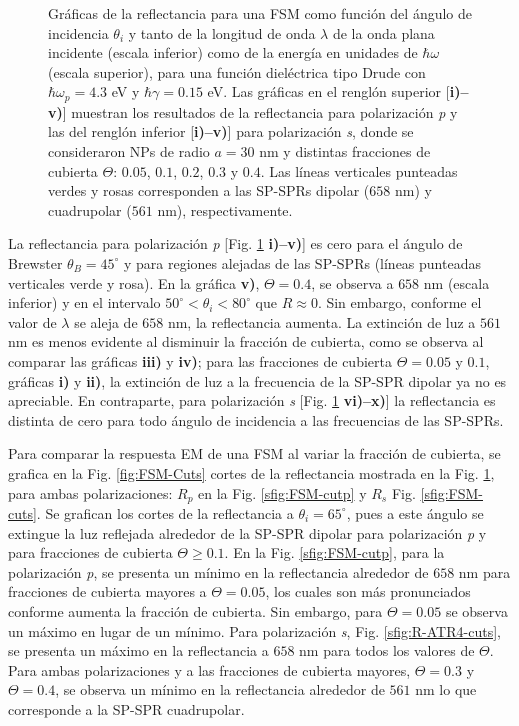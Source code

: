 \begin{figure}[h!]
\begin{tikzpicture}[scale=1]
\end{tikzpicture}\vspace*{-.75em}
	\caption{Gráficas de la reflectancia para una FSM como función del ángulo de incidencia $\theta_i$ y tanto de la longitud de onda $\lambda$ de la onda plana incidente (escala inferior) como de la energía en  unidades de $\hbar\omega$ (escala superior), para una función dieléctrica tipo Drude con $\hbar\omega_p=4. 3$ eV  y  $\hbar\gamma=0. 15$ eV.  Las gráficas   en el renglón superior [\textbf{i)--v)}]  muestran los resultados de la reflectancia para  polarización \emph{p} y las del renglón inferior  [\textbf{i)--v)}] para polarización  \emph{s}, donde se consideraron NPs de radio $a=30$ nm y distintas fracciones de cubierta $\Theta$: $0. 05$, $0. 1$, $0. 2$, $0. 3$ y $0. 4$. Las líneas verticales punteadas verdes y rosas corresponden a las SP-SPRs dipolar ($658$ nm) y cuadrupolar ($561$ nm), respectivamente.}	\label{fig:R-FSM}	
	\end{figure}		
					
La reflectancia para polarización \emph{p} [Fig. \ref{fig:R-FSM} \textbf{i)--v)}] es cero para el ángulo de Brewster $\theta_B = 45^\circ$ y para regiones alejadas de las SP-SPRs (líneas punteadas verticales verde y rosa). En la gráfica \textbf{v)}, $\Theta=0.4$,  se observa a $658$ nm (escala inferior) y en el intervalo $50^\circ<\theta_i<80^\circ$ que $R\approx 0$. Sin embargo, conforme el valor de $\lambda$ se aleja de $658$ nm, la reflectancia aumenta. La extinción de luz a $561$ nm  es menos evidente al disminuir la fracción de cubierta, como se observa al comparar las gráficas \textbf{iii)} y \textbf{iv)}; para las fracciones de cubierta $\Theta=0.05$ y $0.1$, gráficas \textbf{i)} y \textbf{ii)}, la extinción de luz a la frecuencia de la SP-SPR dipolar  ya no es apreciable. En contraparte, para polarización \emph{s} [Fig. \ref{fig:R-FSM} \textbf{vi)--x)}] la reflectancia es distinta de cero para todo ángulo de incidencia a las frecuencias de las SP-SPRs. 

Para comparar la respuesta EM de una FSM al variar la fracción de cubierta, se grafica en la Fig. \ref{fig:FSM-Cuts} cortes de la reflectancia mostrada en la Fig. \ref{fig:R-FSM}, para ambas polarizaciones: $R_p$ en la Fig. \ref{sfig:FSM-cutp} y  $R_s$ Fig. \ref{sfig:FSM-cuts}. Se grafican los cortes de la reflectancia a $\theta_i = 65^\circ$, pues a este ángulo se extingue la luz reflejada alrededor de la SP-SPR dipolar para polarización \emph{p} y para fracciones de cubierta $\Theta\geq 0.1$. En la Fig. \ref{sfig:FSM-cutp}, para la polarización \emph{p}, se presenta un mínimo en la reflectancia alrededor de $658$ nm para fracciones de cubierta mayores a $\Theta = 0.05$, los cuales son más pronunciados conforme aumenta la fracción de cubierta. Sin embargo, para $\Theta=0.05$ se observa un máximo en lugar de un mínimo. Para polarización \emph{s}, Fig. \ref{sfig:R-ATR4-cuts}, se presenta un máximo en la reflectancia a $658$ nm para todos los valores de $\Theta$. Para ambas polarizaciones y a las fracciones de cubierta mayores, $\Theta = 0.3$ y $\Theta = 0.4$,  se observa un  mínimo en la reflectancia alrededor de $561$ nm  lo que corresponde a la SP-SPR cuadrupolar.

